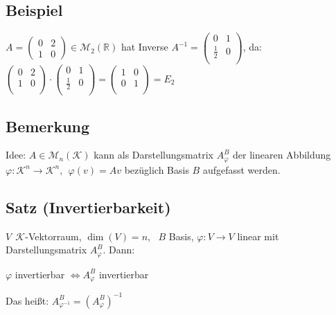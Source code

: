 \documentclass[a4paper, 12pt,titlepage, pdf, headsepline]{article}
\newcommand{\R}{\mathds{R}}
\newcommand{\K}{\mathcal{K}}
\newcommand{\M}{\mathcal{M}}
\renewcommand{\>}{\rightarrow}
\renewcommand{\*}{\cdot}
\renewcommand{\phi}{\varphi}
\begin{document}
\subsection{Beispiel}
$A = \begin{pmatrix}
0 & 2 \\
1 & 0
\end{pmatrix}\in\M_2(\R)$ hat Inverse $A^{-1} =  \begin{pmatrix}
0 & 1 \\
\frac{1}{2} & 0\\
\end{pmatrix}$, da:\\
$\begin{pmatrix}
0 & 2 \\
1 & 0 \\
\end{pmatrix} \cdot \begin{pmatrix}
0 & 1 \\
\frac{1}{2} & 0 \\
\end{pmatrix} = \begin{pmatrix}
1 & 0  \\
0 & 1 \\
\end{pmatrix} = E_2$
\subsection{Bemerkung}
\label{7.14}
Idee: $A \in \M_n(\K)$ kann als Darstellungsmatrix $A_\phi^B$ der linearen Abbildung $\phi: \K^n \rightarrow \K^n,~~ \phi(v) = Av$ bezüglich Basis $B$ aufgefasst werden.
\subsection{Satz (Invertierbarkeit)}
\label{7.15}
$V~~\K$-Vektorraum, $\dim(V) = n,~~~ B$ Basis, $\phi: V \rightarrow V$ linear mit Darstellungsmatrix $A_\phi^B$. Dann:
\begin{center}
	$\phi$ invertierbar $\Leftrightarrow A^B_\phi$ invertierbar
\end{center}
Das heißt:  $A_{\phi^{-1}}^B = (A_\phi^B)^{-1}$
\end{document}

